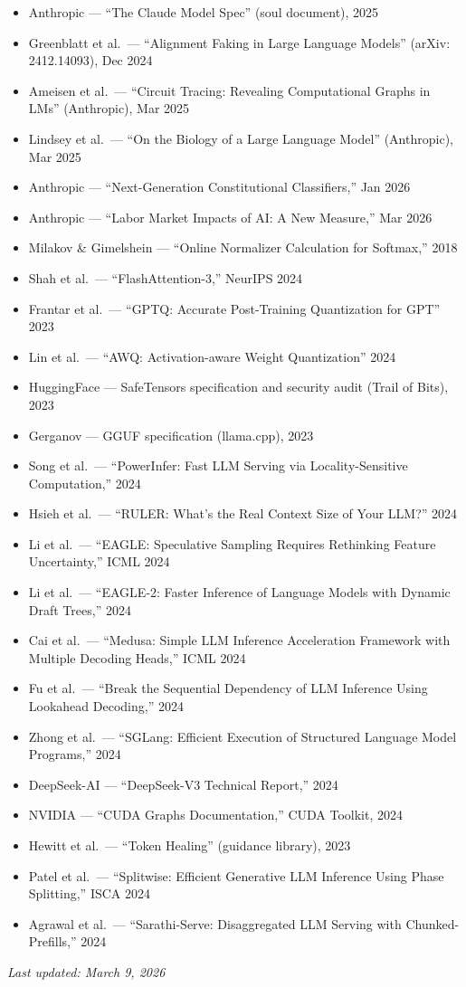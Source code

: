 \documentclass[11pt,a4paper]{article}
\begin{document}
\begin{itemize}
  \item Anthropic --- ``The Claude Model Spec'' (soul document), 2025
  \item Greenblatt et al.\ --- ``Alignment Faking in Large Language Models'' (arXiv: 2412.14093), Dec 2024
  \item Ameisen et al.\ --- ``Circuit Tracing: Revealing Computational Graphs in LMs'' (Anthropic), Mar 2025
  \item Lindsey et al.\ --- ``On the Biology of a Large Language Model'' (Anthropic), Mar 2025
  \item Anthropic --- ``Next-Generation Constitutional Classifiers,'' Jan 2026
  \item Anthropic --- ``Labor Market Impacts of AI: A New Measure,'' Mar 2026
  \item Milakov \& Gimelshein --- ``Online Normalizer Calculation for Softmax,'' 2018
  \item Shah et al.\ --- ``FlashAttention-3,'' NeurIPS 2024
  \item Frantar et al.\ --- ``GPTQ: Accurate Post-Training Quantization for GPT'' 2023
  \item Lin et al.\ --- ``AWQ: Activation-aware Weight Quantization'' 2024
  \item HuggingFace --- SafeTensors specification and security audit (Trail of Bits), 2023
  \item Gerganov --- GGUF specification (llama.cpp), 2023
  \item Song et al.\ --- ``PowerInfer: Fast LLM Serving via Locality-Sensitive Computation,'' 2024
  \item Hsieh et al.\ --- ``RULER: What's the Real Context Size of Your LLM?'' 2024
  \item Li et al.\ --- ``EAGLE: Speculative Sampling Requires Rethinking Feature Uncertainty,'' ICML 2024
  \item Li et al.\ --- ``EAGLE-2: Faster Inference of Language Models with Dynamic Draft Trees,'' 2024
  \item Cai et al.\ --- ``Medusa: Simple LLM Inference Acceleration Framework with Multiple Decoding Heads,'' ICML 2024
  \item Fu et al.\ --- ``Break the Sequential Dependency of LLM Inference Using Lookahead Decoding,'' 2024
  \item Zhong et al.\ --- ``SGLang: Efficient Execution of Structured Language Model Programs,'' 2024
  \item DeepSeek-AI --- ``DeepSeek-V3 Technical Report,'' 2024
  \item NVIDIA --- ``CUDA Graphs Documentation,'' CUDA Toolkit, 2024
  \item Hewitt et al.\ --- ``Token Healing'' (guidance library), 2023
  \item Patel et al.\ --- ``Splitwise: Efficient Generative LLM Inference Using Phase Splitting,'' ISCA 2024
  \item Agrawal et al.\ --- ``Sarathi-Serve: Disaggregated LLM Serving with Chunked-Prefills,'' 2024
\end{itemize}

\vfill
\begin{center}
\textit{Last updated: March 9, 2026}
\end{center}
\end{document}
